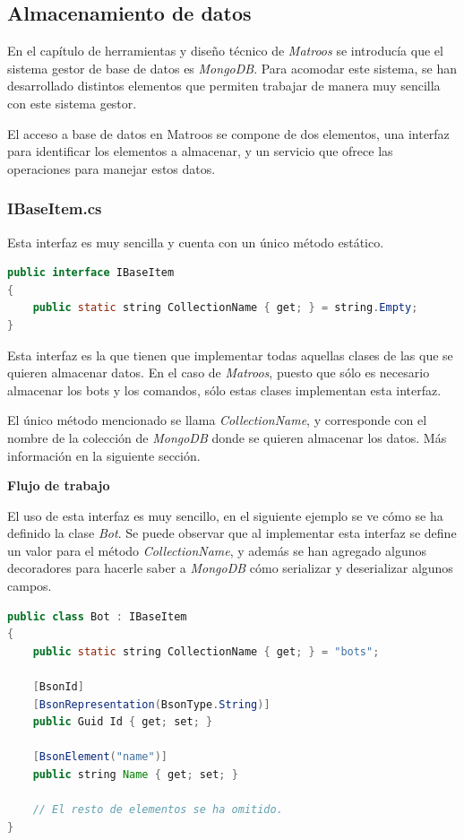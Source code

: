 \subsection{Almacenamiento de datos}

En el capítulo de herramientas y diseño técnico de \textit{Matroos} se introducía que el sistema gestor de base de datos es \textit{MongoDB}. Para acomodar este sistema, se han desarrollado distintos elementos que permiten trabajar de manera muy sencilla con este sistema gestor.

El acceso a base de datos en Matroos se compone de dos elementos, una interfaz para identificar los elementos a almacenar, y un servicio que ofrece las operaciones para manejar estos datos.

\subsubsection{IBaseItem.cs}

Esta interfaz es muy sencilla y cuenta con un único método estático.

\begin{lstlisting}[language=java]
public interface IBaseItem
{
    public static string CollectionName { get; } = string.Empty;
}
\end{lstlisting}

Esta interfaz es la que tienen que implementar todas aquellas clases de las que se quieren almacenar datos. En el caso de \textit{Matroos}, puesto que sólo es necesario almacenar los bots y los comandos, sólo estas clases implementan esta interfaz.

El único método mencionado se llama \textit{CollectionName}, y corresponde con el nombre de la colección de \textit{MongoDB} donde se quieren almacenar los datos. Más información en la siguiente sección.

\medskip 

\textbf{Flujo de trabajo}

El uso de esta interfaz es muy sencillo, en el siguiente ejemplo se ve cómo se ha definido la clase \textit{Bot}. Se puede observar que al implementar esta interfaz se define un valor para el método \textit{CollectionName}, y además se han agregado algunos decoradores para hacerle saber a \textit{MongoDB} cómo serializar y deserializar algunos campos.

\begin{lstlisting}[language=java]
public class Bot : IBaseItem
{
    public static string CollectionName { get; } = "bots";

    [BsonId]
    [BsonRepresentation(BsonType.String)]
    public Guid Id { get; set; }
    
    [BsonElement("name")]
    public string Name { get; set; }
    
    // El resto de elementos se ha omitido.
}
\end{lstlisting}

